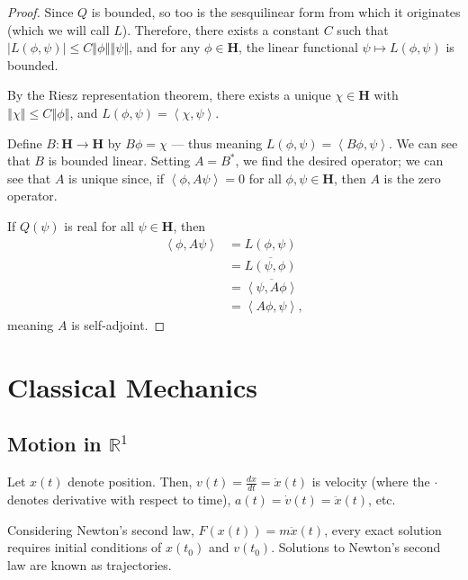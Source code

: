 \documentclass[12pt]{extarticle}
\newcommand{\R}{\mathbb{R}}
\newcommand{\iprod}[2]{\left\langle #1,#2\right\rangle}
\newcommand{\norm}[1]{\left\Vert #1\right\Vert}
\theoremstyle{plain}
\theoremstyle{definition}
\theoremstyle{remark}
\renewcommand{\newline}{\hfill\break}
\begin{document}
  \begin{proof}
    Since $Q$ is bounded, so too is the sesquilinear form from which it originates (which we will call $L$). Therefore, there exists a constant $C$ such that $\left\vert L(\phi,\psi) \right\vert\leq C\norm{\phi}\norm{\psi}$, and for any $\phi \in \mathbf{H}$, the linear functional $\psi \mapsto L(\phi,\psi)$ is bounded.\newline

    By the Riesz representation theorem, there exists a unique $\chi \in \mathbf{H}$ with $\norm{\chi} \leq C\norm{\phi}$, and $L(\phi,\psi) = \iprod{\chi}{\psi}$.\newline

    Define $B: \mathbf{H}\rightarrow \mathbf{H}$ by $B\phi = \chi$ --- thus meaning $L(\phi,\psi) = \iprod{B\phi}{\psi}$. We can see that $B$ is bounded linear. Setting $A = B^{\ast}$, we find the desired operator; we can see that $A$ is unique since, if $\iprod{\phi}{A\psi} = 0$ for all $\phi,\psi \in \mathbf{H}$, then $A$ is the zero operator.\newline

    If $Q(\psi)$ is real for all $\psi \in \mathbf{H}$, then
    \begin{align*}
      \iprod{\phi}{A\psi} &= L(\phi,\psi)\\
                          &= \overline{L(\psi,\phi)}\\
                          &= \overline{\iprod{\psi}{A\phi}}\\
                          &= \iprod{A\phi}{\psi},
    \end{align*}
    meaning $A$ is self-adjoint.
  \end{proof}
  \section{Classical Mechanics}%
  \subsection{Motion in $\R^{1}$}%
  Let $x(t)$ denote position. Then, $v(t) = \frac{dx}{dt} = \dot{x}(t)$ is velocity (where the $\cdot$ denotes derivative with respect to time), $a(t) = \dot{v}(t) = \ddot{x}(t)$, etc.\newline

  Considering Newton's second law, $F(x(t)) = m\ddot{x}(t)$, every exact solution requires initial conditions of $x(t_0)$ and $v(t_0)$. Solutions to Newton's second law are known as trajectories.\newline
\end{document}

